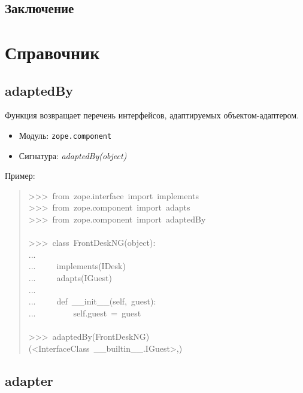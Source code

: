 \documentclass[a4paper,openany,twoside,final]{book}
\providecommand*{\DUroletitlereference}[1]{\textsl{#1}}
\begin{document}
\section{Заключение%
  \label{id53}%
}


\chapter{Справочник%
  \label{id54}%
}


\section*{adaptedBy%
  \label{adaptedby}%
}

Функция возвращает перечень интерфейсов, адаптируемых
объектом-адаптером.

\begin{itemize}

\item Модуль: \texttt{zope.component}

\item Сигнатура: \DUroletitlereference{adaptedBy(object)}

\end{itemize}

Пример:

\begin{quote}{\ttfamily \raggedright \noindent
>{}>{}>~from~zope.interface~import~implements\\
>{}>{}>~from~zope.component~import~adapts\\
>{}>{}>~from~zope.component~import~adaptedBy\\
~\\
>{}>{}>~class~FrontDeskNG(object):\\
...\\
...~~~~~implements(IDesk)\\
...~~~~~adapts(IGuest)\\
...\\
...~~~~~def~\_\_init\_\_(self,~guest):\\
...~~~~~~~~~self.guest~=~guest\\
~\\
>{}>{}>~adaptedBy(FrontDeskNG)\\
(<InterfaceClass~\_\_builtin\_\_.IGuest>,)
}
\end{quote}


\section*{adapter%
  \label{id55}%
}
\end{document}
